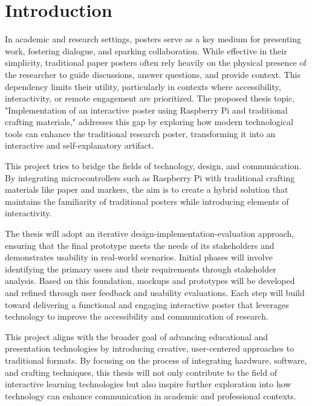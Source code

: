 \chapter{Introduction}
\label{sec:Introduction}

In academic and research settings, posters serve as a key medium for presenting work, fostering dialogue, and sparking collaboration. While effective in their simplicity, traditional paper posters often rely heavily on the physical presence of the researcher to guide discussions, answer questions, and provide context. This dependency limits their utility, particularly in contexts where accessibility, interactivity, or remote engagement are prioritized. The proposed thesis topic, "Implementation of an interactive poster using Raspberry Pi and traditional crafting materials," addresses this gap by exploring how modern technological tools can enhance the traditional research poster, transforming it into an interactive and self-explanatory artifact.

This project tries to bridge the fields of technology, design, and communication. By integrating microcontrollers such as Raspberry Pi with traditional crafting materials like paper and markers, the aim is to create a hybrid solution that maintains the familiarity of traditional posters while introducing elements of interactivity. %

The thesis will adopt an iterative design-implementation-evaluation approach, ensuring that the final prototype meets the needs of its stakeholders and demonstrates usability in real-world scenarios. Initial phases will involve identifying the primary users and their requirements through stakeholder analysis. Based on this foundation, mockups and prototypes will be developed and refined through user feedback and usability evaluations. Each step will build toward delivering a functional and engaging interactive poster that leverages technology to improve the accessibility and communication of research.

This project aligns with the broader goal of advancing educational and presentation technologies by introducing creative, user-centered approaches to traditional formats. By focusing on the process of integrating hardware, software, and crafting techniques, this thesis will not only contribute to the field of interactive learning technologies but also inspire further exploration into how technology can enhance communication in academic and professional contexts.